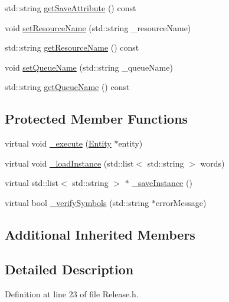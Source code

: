 \begin{DoxyCompactItemize}
std\-::string \hyperlink{class_release_a525e021be268daa004f06559d83081c3}{get\-Save\-Attribute} () const 
\item 
void \hyperlink{class_release_a26fda460abe6f9a92872027014c41d4a}{set\-Resource\-Name} (std\-::string \-\_\-resource\-Name)
\item 
std\-::string \hyperlink{class_release_a75e54be899af04450feb2d8a1c32cfe7}{get\-Resource\-Name} () const 
\item 
void \hyperlink{class_release_ae845be9db739fbb317bd05f0b0fe21c5}{set\-Queue\-Name} (std\-::string \-\_\-queue\-Name)
\item 
std\-::string \hyperlink{class_release_aa8571b1bd8a9880d316a2556df1a07f3}{get\-Queue\-Name} () const 
\end{DoxyCompactItemize}
\subsection*{Protected Member Functions}
\begin{DoxyCompactItemize}
\item 
virtual void \hyperlink{class_release_a63c3cd89082e7f6c1fb61646b93a5c32}{\-\_\-execute} (\hyperlink{class_entity}{Entity} $\ast$entity)
\item 
virtual void \hyperlink{class_release_a1c3820675ad6a119a8cc6a75b870bd49}{\-\_\-load\-Instance} (std\-::list$<$ std\-::string $>$ words)
\item 
virtual std\-::list$<$ std\-::string $>$ $\ast$ \hyperlink{class_release_a2e15540e86b8d0ce62c553f3e9b095c3}{\-\_\-save\-Instance} ()
\item 
virtual bool \hyperlink{class_release_a81a30c1357d00e830bdc044418865e31}{\-\_\-verify\-Symbols} (std\-::string $\ast$error\-Message)
\end{DoxyCompactItemize}
\subsection*{Additional Inherited Members}


\subsection{Detailed Description}


Definition at line 23 of file Release.\-h.



